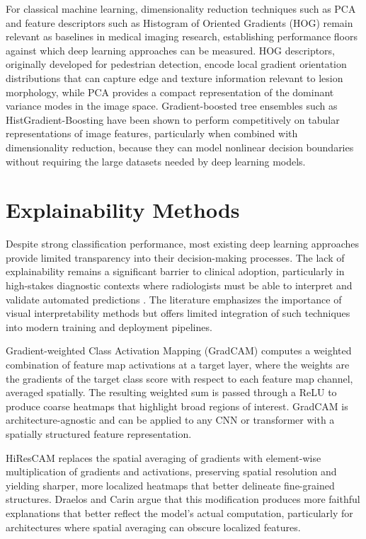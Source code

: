 \documentclass[justified,notoc,openany]{tufte-book}
\begin{document}
For classical machine learning, dimensionality reduction techniques such as PCA and feature descriptors such as Histogram of Oriented Gradients (HOG) remain relevant as baselines in medical imaging research, establishing performance floors against which deep learning approaches can be measured. HOG descriptors, originally developed for pedestrian detection, encode local gradient orientation distributions that can capture edge and texture information relevant to lesion morphology, while PCA provides a compact representation of the dominant variance modes in the image space. Gradient-boosted tree ensembles such as HistGradient-Boosting have been shown to perform competitively on tabular representations of image features, particularly when combined with dimensionality reduction, because they can model nonlinear decision boundaries without requiring the large datasets needed by deep learning models.

\section{Explainability Methods}\label{explainability-methods}

Despite strong classification performance, most existing deep learning approaches provide limited transparency into their decision-making processes. The lack of explainability remains a significant barrier to clinical adoption, particularly in high-stakes diagnostic contexts where radiologists must be able to interpret and validate automated predictions \cite{Lee2017}. The literature emphasizes the importance of visual interpretability methods but offers limited integration of such techniques into modern training and deployment pipelines.

Gradient-weighted Class Activation Mapping (GradCAM) \cite{Selvaraju2017} computes a weighted combination of feature map activations at a target layer, where the weights are the gradients of the target class score with respect to each feature map channel, averaged spatially. The resulting weighted sum is passed through a ReLU to produce coarse heatmaps that highlight broad regions of interest. GradCAM is architecture-agnostic and can be applied to any CNN or transformer with a spatially structured feature representation.

HiResCAM \cite{DraelosCarin2021} replaces the spatial averaging of gradients with element-wise multiplication of gradients and activations, preserving spatial resolution and yielding sharper, more localized heatmaps that better delineate fine-grained structures. Draelos and Carin argue that this modification produces more faithful explanations that better reflect the model's actual computation, particularly for architectures where spatial averaging can obscure localized features.
\end{document}
